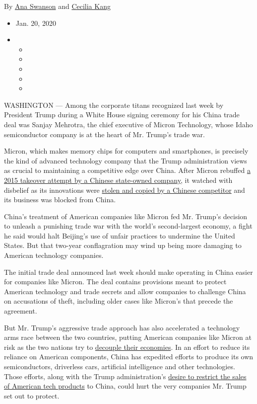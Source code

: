 By \href{https://www.nytimes.com/by/ana-swanson}{Ana Swanson} and
\href{https://www.nytimes.com/by/cecilia-kang}{Cecilia Kang}

\begin{itemize}
\item
  Jan. 20, 2020
\item
  \begin{itemize}
  \item
  \item
  \item
  \item
  \item
  \end{itemize}
\end{itemize}

WASHINGTON --- Among the corporate titans recognized last week by
President Trump during a White House signing ceremony for his China
trade deal was Sanjay Mehrotra, the chief executive of Micron
Technology, whose Idaho semiconductor company is at the heart of Mr.
Trump's trade war.

Micron, which makes memory chips for computers and smartphones, is
precisely the kind of advanced technology company that the Trump
administration views as crucial to maintaining a competitive edge over
China. After Micron rebuffed
\href{https://www.nytimes.com/2015/07/15/business/international/micron-technology-is-said-to-be-takeover-target-of-chinese-company.html}{a
2015 takeover attempt by a Chinese state-owned company}, it watched with
disbelief as its innovations were
\href{https://www.nytimes.com/2018/06/22/technology/china-micron-chips-theft.html}{stolen
and copied by a Chinese competitor} and its business was blocked from
China.

China's treatment of American companies like Micron fed Mr. Trump's
decision to unleash a punishing trade war with the world's
second-largest economy, a fight he said would halt Beijing's use of
unfair practices to undermine the United States. But that two-year
conflagration may wind up being more damaging to American technology
companies.

The initial trade deal announced last week should make operating in
China easier for companies like Micron. The deal contains provisions
meant to protect American technology and trade secrets and allow
companies to challenge China on accusations of theft, including older
cases like Micron's that precede the agreement.

But Mr. Trump's aggressive trade approach has also accelerated a
technology arms race between the two countries, putting American
companies like Micron at risk as the two nations try to
\href{https://www.nytimes.com/2019/05/14/business/us-china-tariffs.html}{decouple
their economies}. In an effort to reduce its reliance on American
components, China has expedited efforts to produce its own
semiconductors, driverless cars, artificial intelligence and other
technologies. Those efforts, along with the Trump administration's
\href{https://www.nytimes.com/2019/10/23/business/trump-technology-china-trade.html}{desire
to restrict the sales of American tech products} to China, could hurt
the very companies Mr. Trump set out to protect.

